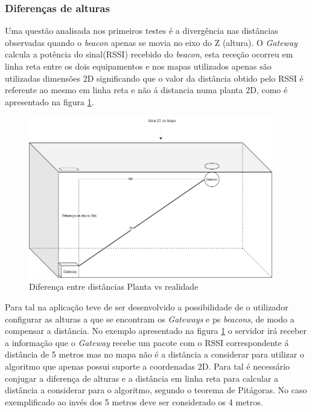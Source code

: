 \subsubsection{Diferenças de alturas}

\par Uma questão analisada nos primeiros testes é a divergência nas distâncias observadas quando o \textit{beacon} apenas se movia no eixo do Z (altura). O \textit{Gateway} calcula a potência do sinal(RSSI) recebido do \textit{beacon}, esta receção ocorreu em linha reta entre os dois equipamentos e nos mapas utilizados apenas são utilizadas dimensões 2D significando que o valor da distância obtido pelo RSSI é referente ao mesmo em linha reta e não á distancia numa planta 2D, como é apresentado na figura \ref{altura1}.

\begin{figure}[ht]
\centering
\includegraphics[width=0.95\textwidth]{images/disr.png}
\caption{Diferença entre distâncias Planta vs realidade}\label{altura1}
\end{figure}


\par Para tal na aplicação teve de ser desenvolvido a possibilidade de o utilizador configurar as alturas a que se encontram os \textit{Gateways} e ps \textit{beacons}, de modo a compensar a distância. No exemplo apresentado na figura \ref{altura1} o servidor irá receber a informação que o \textit{Gateway} recebe um pacote com o RSSI correspondente á distância de 5 metros mas no mapa não é a distância a considerar para utilizar o algoritmo que apenas possui suporte a coordenadas 2D. Para tal é necessário conjugar a diferença de alturas e a distância em linha reta para calcular a distância a considerar para o algoritmo, segundo o teorema de Pitágoras. No caso exemplificado ao invés dos 5 metros deve ser considerado os 4 metros.

